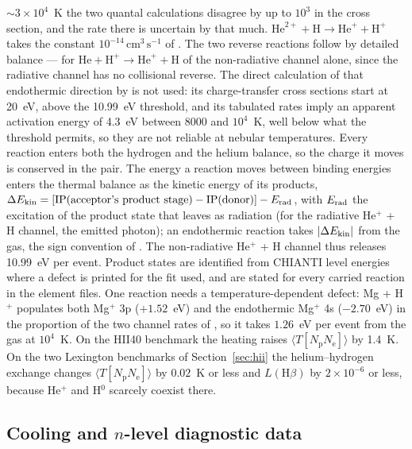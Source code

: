 \documentclass[twocolumn,linenumbers]{aastex702}
\newcommand{\cmc}{\mathrm{cm^{3}\,s^{-1}}}
\begin{document}
$\sim$$3\times10^4$~K the two quantal calculations disagree by up to $10^3$
in the cross section, and the rate there is uncertain by that much.  $\mathrm{He}^{2+} + \mathrm{H} \to \mathrm{He}^{+} +
\mathrm{H}^{+}$ takes the constant $10^{-14}\,\cmc$ of \citet{kingdon1996}.
The two reverse reactions follow by detailed balance --- for
$\mathrm{He} + \mathrm{H}^{+} \to \mathrm{He}^{+} + \mathrm{H}$ of the
non-radiative channel alone, since the radiative channel has no collisional
reverse.  The direct calculation of that endothermic direction by
\citet{kimura1993} is not used: its charge-transfer cross sections start
at 20~eV, above the 10.99~eV threshold, and its tabulated rates imply an
apparent activation energy of 4.3~eV between 8000 and $10^4$~K, well below
what the threshold permits, so they are not reliable at nebular
temperatures.  Every reaction enters both
the hydrogen and the helium balance, so the charge it moves is conserved in the pair.
The energy a reaction moves between binding energies enters the thermal
balance as the kinetic energy of its products,
$\Delta E_{\rm kin} = [{\rm IP}(\text{acceptor's product stage}) -
{\rm IP}(\text{donor})] - E_{\rm rad}$, with $E_{\rm rad}$ the
excitation of the product state that leaves as radiation (for the radiative
He$^{+}$ + H channel, the emitted photon); an endothermic reaction takes
$|\Delta E_{\rm kin}|$ from the gas, the sign convention of
\citet[][\S2]{kingdon1996}.  The non-radiative He$^{+}$ + H channel thus
releases 10.99~eV per event.  Product states are identified from CHIANTI
level energies where a defect is printed for the fit used, and are stated
for every carried reaction in the element files.  One reaction needs a
temperature-dependent defect: Mg + H$^{+}$ populates both Mg$^{+}$ 3p
($+1.52$~eV) and the endothermic Mg$^{+}$ 4s ($-2.70$~eV) in the
proportion of the two channel rates of \citet{allan1988}, so it takes
$1.26$~eV per event from the gas at $10^{4}$~K.  On the HII40 benchmark the
heating raises $\langle T[N_{\mathrm{p}}N_{\mathrm{e}}]\rangle$ by 1.4~K.
On the two Lexington benchmarks of Section~\ref{sec:hii}
the helium--hydrogen exchange changes $\langle T[N_{\mathrm{p}}N_{\mathrm{e}}]\rangle$
by $0.02$~K or less and $L(\mathrm{H}\beta)$ by $2\times10^{-6}$ or less,
because He$^{+}$ and H$^{0}$ scarcely coexist there.

\subsection{Cooling and $n$-level diagnostic data}
\label{sec:cooldata}
\end{document}
